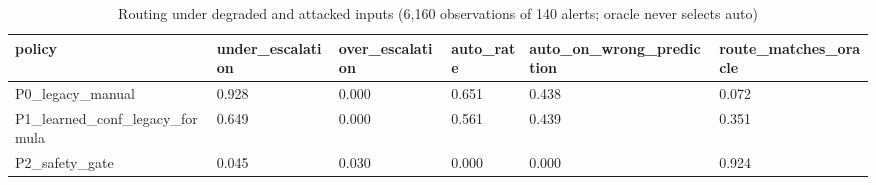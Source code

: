 \begin{table}[t]\centering\caption{Routing under degraded and attacked inputs (6,160 observations of 140 alerts; oracle never selects auto)}
\begin{tabular}{llllll}\hline
policy & under\_escalation & over\_escalation & auto\_rate & auto\_on\_wrong\_prediction & route\_matches\_oracle \\\hline
P0\_legacy\_manual & 0.928 & 0.000 & 0.651 & 0.438 & 0.072 \\
P1\_learned\_conf\_legacy\_formula & 0.649 & 0.000 & 0.561 & 0.439 & 0.351 \\
P2\_safety\_gate & 0.045 & 0.030 & 0.000 & 0.000 & 0.924 \\
\hline\end{tabular}\end{table}
